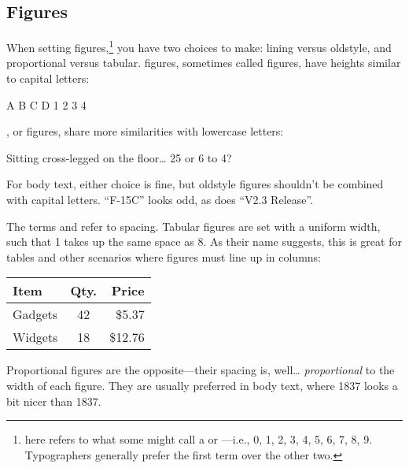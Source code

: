 \subsection{Figures}

When setting figures,\punckern\footnote{
here refers to what some might call a  or
---i.e., 0, 1, 2, 3, 4, 5, 6, 7, 8, 9.
Typographers generally prefer the first term over the other two.}
you have two
choices to make: lining versus oldstyle,
and proportional versus tabular.
 figures, sometimes called  figures,
have heights similar to capital letters:
\begin{leftfigure}
A B C D 1 2 3 4
\end{leftfigure}
, or  figures,
share more similarities with lowercase letters:
\begin{leftfigure}
Sitting cross-legged on the floor\dots{} 25 or 6 to 4?
\end{leftfigure}
For body text, either choice is fine, but oldstyle figures shouldn't
be combined with capital letters.
``F-15C'' looks odd, as does ``V2.3 Release''\quotekern.

{
The terms  and  refer to spacing.
Tabular figures are set with a uniform width, such that 1 takes up
the same space as 8.
As their name suggests, this is great for tables and other scenarios
where figures must line up in columns:}
\begin{leftfigure}
\begin{tabular}{l|c r}
Item & Qty. & Price \\
\hline
Gadgets & 42 & \$5.37 \\
Widgets & 18 & \$12.76 \\
\end{tabular}
\end{leftfigure}
Proportional figures are the opposite---their spacing is, well\dots{}
\emph{proportional} to the width of each figure.
They are usually preferred in body text, where 1837
looks a bit nicer than
{1837}.

